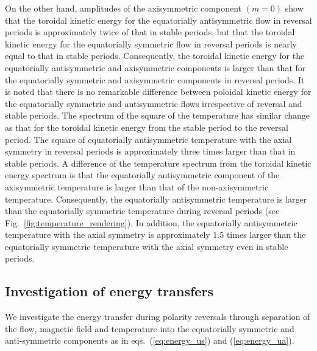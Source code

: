 On the other hand, amplitudes of the axisymmetric component $(m = 0)$ show that the toroidal kinetic energy for the equatorially antisymmetric flow in reversal periods is approximately twice of that in stable periods, but that the toroidal kinetic energy for the equatorially symmetric flow in reversal periods is nearly equal to that in stable periods.
Consequently, the toroidal kinetic energy for the equatorially antisymmetric and axisymmetric components is larger than that for the equatorially symmetric and  axisymmetric components  in reversal periods.
It is noted that there is no remarkable difference between poloidal kinetic energy for the equatorially symmetric and antisymmetric flows irrespective of reversal and stable periods.
The spectrum of the square of the temperature has similar change as that for the toroidal kinetic energy from the stable period to the reversal period.
The square of equatorially antisymmetric temperature with the axial symmetry in reversal periods is approximately three times larger than that in stable periods.
A difference of the temperature spectrum from the toroidal kinetic energy spectrum is that the equatorially antisymmetric component of the axisymmetric temperature is larger than that of the non-axisymmetric temperature.
Consequently, the equatorially antisymmetric temperature is larger than the equatorially symmetric temperature during reversal periods (see Fig.~\ref{fig:temperature_rendering}). 
In addition, the equatorially antisymmetric temperature with the axial symmetry is approximately 1.5 times larger than the equatorially symmetric temperature with the axial symmetry even in stable periods.



\subsection{Investigation of energy transfers}
\label{sec:energy_transfer}

We investigate the energy transfer during polarity reversals through separation of the flow, magnetic field and temperature into the equatorially symmetric and anti-symmetric components as in eqs.~(\ref{eq:energy_us}) and (\ref{eq:energy_ua}).

